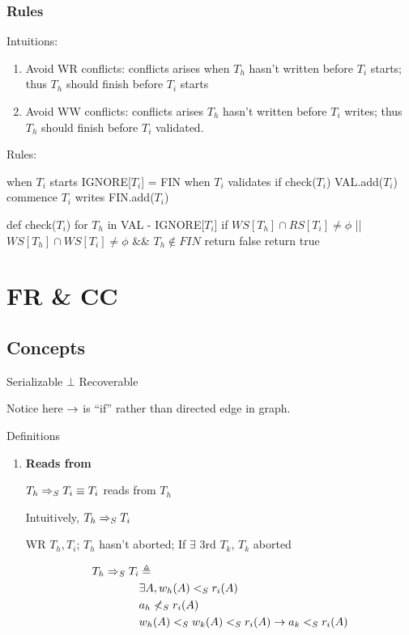\documentclass[a4paper]{report}
\begin{document}
\subsection{Rules}
Intuitions:
\begin{enumerate}
\item Avoid WR conflicts: conflicts arises when $T_h$ hasn't written before $T_i$ starts; thus $T_h$ should finish before $T_i$ starts
\item Avoid WW conflicts: conflicts arises $T_h$ hasn't written before $T_i$ writes; thus $T_h$ should finish before $T_i$ validated.
\end{enumerate}
Rules:
\begin{pseudo}
when $T_i$ starts
  IGNORE[$T_i$] = FIN
when $T_i$ validates
  if check($T_i$)
    VAL.add($T_i$)
    commence $T_i$ writes
    FIN.add($T_i$)

def check($T_i$)
  for $T_h$ in VAL - IGNORE[$T_i$]
    if $WS[T_h]\cap RS[T_i] \neq \phi$ || $WS[T_h]\cap WS[T_i] \neq \phi$ && $T_h \notin FIN$
      return false
  return true

\end{pseudo}
\chapter{FR \& CC}
\section{Concepts}
Serializable $\bot$ Recoverable

Notice here $\rightarrow$ is ``if'' rather than directed edge in graph.

Definitions
\begin{enumerate}
\item \textbf{Reads from}

$T_h \Rightarrow_S T_i \equiv T_i$ reads from $T_h$

Intuitively, $T_h \Rightarrow_S T_i$
\begin{enumerate}
\treeitem WR $T_h, T_i$;
\treeitem $T_h$ hasn't aborted;
\treeitem If $\exists$ 3rd $T_k$, $T_k$ aborted
\end{enumerate}
\begin{align*}
T_h \Rightarrow_S T_i &\triangleq \\
& \exists A, w_h(A) <_S r_i(A) \\
& a_h \nless_S r_i(A) \\
& w_h(A) <_S w_k(A) <_S r_i(A) \rightarrow a_k <_S r_i(A)
\end{align*}



\end{enumerate}
\end{document}
